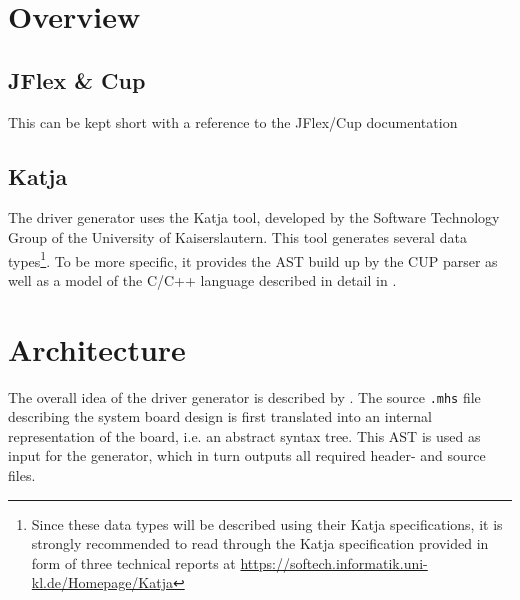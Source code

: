 \documentclass{report}
\begin{document}
\section{Overview}

\subsection{JFlex \& Cup}
This can be kept short with a reference to the JFlex/Cup documentation

\subsection{Katja}
The driver generator uses the Katja tool, developed by the Software Technology Group of the University of Kaiserslautern. This tool generates several data types\footnote{Since these data types will be described using their Katja specifications, it is strongly recommended to read through the Katja specification provided in form of three technical reports at \url{https://softech.informatik.uni-kl.de/Homepage/Katja}}. To be more specific, it provides the AST build up by the CUP parser as well as a model of the C/C++ language described in detail in .

\section{Architecture}
The overall idea of the driver generator is described by . The source \texttt{.mhs} file describing the system board design is first translated into an internal representation of the board, i.e. an abstract syntax tree. This AST is used as input for the generator, which in turn outputs all required header- and source files.
\end{document}

